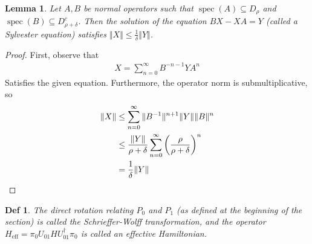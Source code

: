 \documentclass[11pt]{article}
\newtheorem{defn}{Def}
\newtheorem{lem}{Lemma}
\newcommand{\spec}{\operatorname{spec}}
\begin{document}
\begin{lem}
    Let $A, B$ be normal operators such that $\spec(A) \subseteq D_\rho$ and $\spec(B) \subseteq D_{\rho+\delta}^c$.  Then the solution of the equation $BX - XA = Y$ (called a Sylvester equation) satisfies $\Vert X \Vert  \leq \frac{1}{\delta}\Vert Y \Vert$.
\end{lem}
\begin{proof}
First, observe that 
\begin{align}
    X = \sum_{n=0}^\infty B^{-n-1}YA^n
\end{align}
Satisfies the given equation. Furthermore, the operator norm is submultiplicative, so
\begin{align}
    \Vert X \Vert &\leq \sum_{n=0}^\infty \Vert B^{-1} \Vert^{n+1} \Vert Y \Vert \Vert B \Vert^n \\
                  &\leq \frac{\Vert Y \Vert}{\rho + \delta} \sum_{n=0}^\infty \qty(\frac{\rho}{\rho + \delta})^n \\
                  &= \frac{1}{\delta}\Vert Y \Vert
\end{align}
\end{proof}
\begin{defn}
    The direct rotation relating $P_0$ and $P_1$ (as defined at the beginning of the section) is called the Schrieffer-Wolff transformation, and the operator $H_{\text{eff}} = \pi_0U_{01}H U_{01}^\dagger \pi_0$ is called an effective Hamiltonian.
\end{defn}
\end{document}
